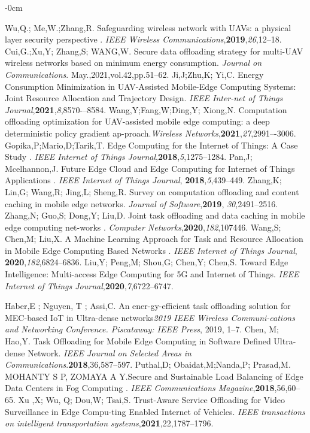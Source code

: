 \documentclass[journal,article,submit,pdftex,moreauthors]{Definitions/mdpi}
\begin{document}
\begin{adjustwidth}{-\extralength}{0cm}
\begin{thebibliography}{999}
	Wu,Q.; Me,W.;Zhang,R. Safeguarding wireless network with UAVs: a physical layer security perspective . \emph{IEEE Wireless Communications},\textbf{2019},\emph{26},12--18.
Cui,G.;Xu,Y; Zhang,S; WANG,W. Secure data offloading strategy for multi-UAV wireless networks based on minimum energy consumption. \emph{Journal on Communications}. May.,2021,vol.42,pp.51--62.
Ji,J;Zhu,K; Yi,C. Energy Consumption Minimization in UAV-Assisted Mobile-Edge Computing Systems: Joint Resource Allocation and Trajectory Design. \emph{IEEE Inter-net of Things Journal},\textbf{2021},\emph{8},8570-–8584.
Wang,Y;Fang,W;Ding,Y; Xiong,N. Computation offloading optimization for UAV-assisted mobile edge computing: a deep deterministic policy gradient ap-proach.\emph{Wireless Networks},\textbf{2021},\emph{27},2991–-3006.
Gopika,P;Mario,D;Tarik,T. Edge Computing for the Internet of Things: A Case Study .\emph{ IEEE Internet of Things Journal},\textbf{2018},\emph{5},1275--1284.
Pan,J; Mcelhannon,J. Future Edge Cloud and Edge Computing for Internet of Things Applications . \emph{IEEE Internet of Things Journal}, \textbf{2018},\emph{5},439--449.
Zhang,K; Lin,G; Wang,R; Jing,L; Sheng,R. Survey on computation offloading and content caching in mobile edge networks. \emph{Journal of Software},\textbf{2019}, \emph{30},2491--2516.
Zhang,N; Guo,S; Dong,Y; Liu,D. Joint task offloading and data caching in mobile edge computing net-works . \emph{Computer Networks},\textbf{2020},\emph{182},107446.
Wang,S; Chen,M; Liu,X. A Machine Learning Approach for Task and Resource Allocation in Mobile Edge Computing Based Networks . \emph{IEEE Internet of Things Journal}, \textbf{2020},\emph{182},6824--6836.
Liu,Y; Peng,M; Shou,G; Chen,Y; Chen,S. Toward Edge Intelligence: Multi-access Edge Computing for 5G and Internet of Things.\emph{ IEEE Internet of Things Journal},\textbf{2020},\emph{7},6722--6747.

Haber,E ; Nguyen, T ; Assi,C. An ener-gy-efficient task offloading solution for MEC-based IoT in Ultra-dense networks\emph{2019 IEEE Wireless Communi-cations and Networking Conference. Piscataway: IEEE Press}, 2019, 1--7.
Chen, M; Hao,Y. Task Offloading for Mobile Edge Computing in Software Defined Ultra-dense Network. \emph{IEEE Journal on Selected Areas in Communications}.\textbf{2018},36,587--597. 
Puthal,D; Obaidat,M;Nanda,P; Prasad,M. MOHANTY S P, ZOMAYA A Y.Secure and Sustainable Load Balancing of Edge Data Centers in Fog Computing . \emph{IEEE Communications Magazine},\textbf{2018},56,60--65.
Xu ,X; Wu, Q; Dou,W; Tsai,S. Trust-Aware Service Offloading for Video Surveillance in Edge Compu-ting Enabled Internet of Vehicles. \emph{IEEE transactions on intelligent transportation systems},\textbf{2021},22,1787--1796.



\end{thebibliography}
\end{adjustwidth}
\end{document}

